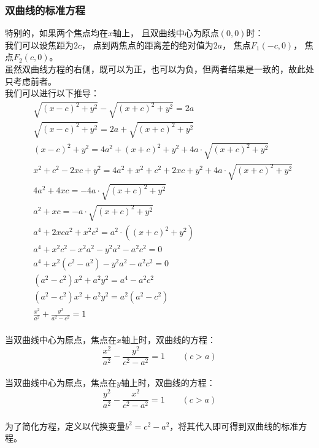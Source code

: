 \documentclass[UTF8]{ctexart}
\begin{document}
\subsubsection{双曲线的标准方程}
    特别的，如果两个焦点均在$x$轴上，
    且双曲线中心为原点$(0,0)$时：\\
    我们可以设焦距为$2c$，
    点到两焦点的距离差的绝对值为$2a$，
    焦点$F_1(-c,0)$，
    焦点$F_2(c,0)$。\\[3mm]
    虽然双曲线方程的右侧，既可以为正，也可以为负，但两者结果是一致的，故此处只考虑前者。\\[3mm]
    我们可以进行以下推导：\vspace{3pt}
    \setcounter{equation}{0}
    \begin{align}
        &\sqrt{(x-c)^2+y^2}-\sqrt{(x+c)^2+y^2}=2a\\[3.5mm]
        &\sqrt{(x-c)^2+y^2}=2a+\sqrt{(x+c)^2+y^2}\\[3.5mm]
        &(x-c)^2+y^2=4a^2+(x+c)^2+y^2+4a \cdot \sqrt{(x+c)^2+y^2}\\[3.5mm]
        &x^2+c^2-2xc+y^2=4a^2+x^2+c^2+2xc+y^2+4a \cdot \sqrt{(x+c)^2+y^2}\\[3.5mm]
        &4a^2+4xc=-4a \cdot \sqrt{(x+c)^2+y^2}\\[3.5mm]
        &a^2+xc=-a \cdot \sqrt{(x+c)^2+y^2}\\[3.5mm]
        &a^4+2xca^2+x^2c^2=a^2 \cdot ((x+c)^2+y^2)\\[3.5mm]
        &a^4+x^2c^2-x^2a^2-y^2a^2-a^2c^2=0\\[3.5mm]
        &a^4+x^2(c^2-a^2)-y^2a^2-a^2c^2=0\\[3.5mm]
        &(a^2-c^2)x^2+a^2y^2=a^4-a^2c^2\\[3.5mm]
        &(a^2-c^2)x^2+a^2y^2=a^2(a^2-c^2)\\[3.5mm]
        &\frac{x^2}{a^2}+\frac{y^2}{a^2-c^2}=1
    \end{align}\\
    当双曲线中心为原点，焦点在$x$轴上时，双曲线的方程：\vspace{5pt}
    \begin{equation}
        \frac{x^2}{a^2}-\frac{y^2}{c^2-a^2}=1\qquad(c>a)
    \end{equation}\\
    当双曲线中心为原点，焦点在$y$轴上时，双曲线的方程：\vspace{5pt}
    \begin{equation}
        \frac{y^2}{a^2}-\frac{x^2}{c^2-a^2}=1\qquad(c>a)
    \end{equation}\\
    为了简化方程，定义以代换变量$b^2=c^2-a^2$，将其代入即可得到双曲线的标准方程。
\end{document}
